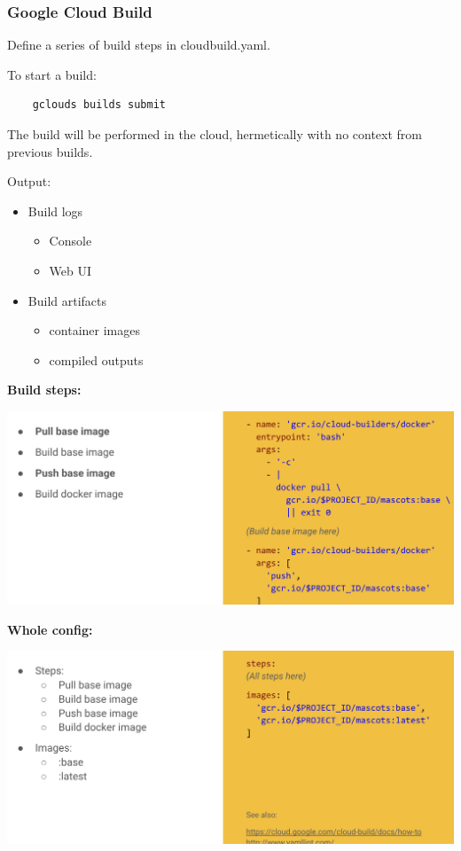 \documentclass{article}
\begin{document}
\subsubsection{Google Cloud Build}

Define a series of build steps in cloudbuild.yaml.

To start a build:
\begin{verbatim}
    gclouds builds submit
\end{verbatim}

The build will be performed in the cloud, hermetically with no context from previous builds.

\vspace*{1em}

Output:
\begin{itemize}
    \item Build logs 
    \begin{itemize}
        \item Console
        \item Web UI 
    \end{itemize}
    \item Build artifacts 
    \begin{itemize}
        \item container images 
        \item compiled outputs
    \end{itemize}
\end{itemize}

\vspace*{1em}

\textbf{Build steps: }

\includegraphics*[width=\linewidth]{buildsteps.png}

\textbf{Whole config: }

\includegraphics*[width=\linewidth]{wholeConfig.png}
\end{document}
